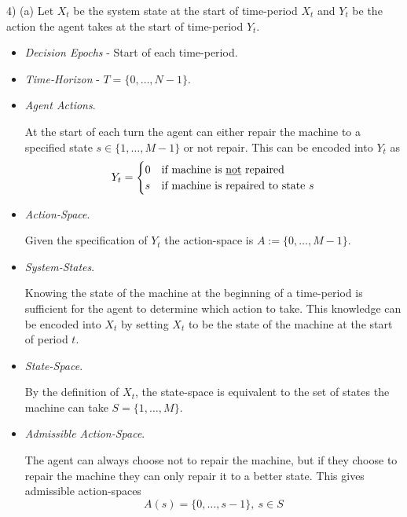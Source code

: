 \documentclass[11pt,a4paper]{article}
\begin{document}
\begin{answer}{4) (a)}
  Let $X_t$ be the system state at the start of time-period $X_t$ and $Y_t$ be the action the agent takes at the start of time-period $Y_t$.
  \begin{itemize}
    \item \textit{Decision Epochs} - Start of each time-period.
    \item \textit{Time-Horizon} - $T=\{0,\dots,N-1\}$.
    \item \textit{Agent Actions}.
    \par At the start of each turn the agent can either repair the machine to a specified state $s\in\{1,\dots,M-1\}$ or not repair. This can be encoded into $Y_t$ as
    \[
      Y_t=\begin{cases}
            0&\text{if machine is \underline{not} repaired}\\
            s&\text{if machine is repaired to state }s
           \end{cases}
    \]

    \item \textit{Action-Space}.
    \par Given the specification of $Y_t$ the action-space is $A:=\{0,\dots,M-1\}$.

    \item \textit{System-States}.
    \par Knowing the state of the machine at the beginning of a time-period is sufficient for the agent to determine which action to take. This knowledge can be encoded into $X_t$ by setting $X_t$ to be the state of the machine at the start of period $t$.

    \item \textit{State-Space}.
    \par By the definition of $X_t$, the state-space is equivalent to the set of states the machine can take $S=\{1,\dots,M\}$.

    \item \textit{Admissible Action-Space}.
    \par The agent can always choose not to repair the machine, but if they choose to repair the machine they can only repair it to a better state. This gives admissible action-spaces
    \[ A(s)=\{0,\dots,s-1\},\ s\in S \]


\end{itemize}
\end{answer}
\end{document}
